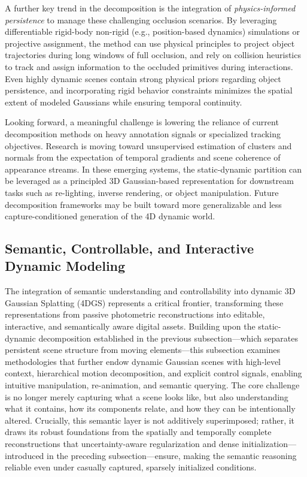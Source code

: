 \documentclass[11pt,a4paper]{article}
\begin{document}
A further key trend in the decomposition is the integration of \emph{physics-informed persistence} to manage these challenging occlusion scenarios. By leveraging differentiable rigid-body non-rigid (e.g., position-based dynamics) simulations or projective assignment, the method can use physical principles to project object trajectories during long windows of full occlusion, and rely on collision heuristics to track and assign information to the occluded primitives during interactions. Even highly dynamic scenes contain strong physical priors regarding object persistence, and incorporating rigid behavior constraints minimizes the spatial extent of modeled Gaussians while ensuring temporal continuity.

Looking forward, a meaningful challenge is lowering the reliance of current decomposition methods on heavy annotation signals or specialized tracking objectives. Research is moving toward unsupervised estimation of clusters and normals from the expectation of temporal gradients and scene coherence of appearance streams. In these emerging systems, the static-dynamic partition can be leveraged as a principled 3D Gaussian-based representation for downstream tasks such as re-lighting, inverse rendering, or object manipulation. Future decomposition frameworks may be built toward more generalizable and less capture-conditioned generation of the 4D dynamic world.


\subsection{Semantic, Controllable, and Interactive Dynamic Modeling}


The integration of semantic understanding and controllability into dynamic 3D Gaussian Splatting (4DGS) represents a critical frontier, transforming these representations from passive photometric reconstructions into editable, interactive, and semantically aware digital assets. Building upon the static-dynamic decomposition established in the previous subsection---which separates persistent scene structure from moving elements---this subsection examines methodologies that further endow dynamic Gaussian scenes with high-level context, hierarchical motion decomposition, and explicit control signals, enabling intuitive manipulation, re-animation, and semantic querying. The core challenge is no longer merely capturing what a scene looks like, but also understanding what it contains, how its components relate, and how they can be intentionally altered. Crucially, this semantic layer is not additively superimposed; rather, it draws its robust foundations from the spatially and temporally complete reconstructions that uncertainty-aware regularization and dense initialization---introduced in the preceding subsection---ensure, making the semantic reasoning reliable even under casually captured, sparsely initialized conditions.
\end{document}
